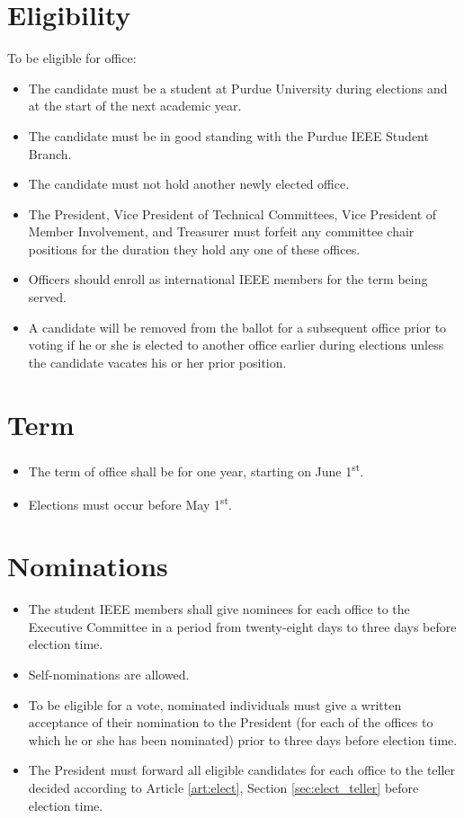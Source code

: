 \documentclass[12pt]{constitution}
\newcommand{\datetermstart}{June 1\textsuperscript{st}} %
\newcommand{\dateelectionsheld}{May 1\textsuperscript{st}} %
\begin{document}
\section{Eligibility}
\label{sec:elect_elig}
To be eligible for office:
\begin{itemize}
    \item The candidate must be a student at Purdue University during elections and at the start of the next academic year.
    \item The candidate must be in good standing with the Purdue IEEE Student Branch.
    \item The candidate must not hold another newly elected office.
    \item The President, Vice President of Technical Committees, Vice President of Member Involvement, and Treasurer must forfeit any committee chair positions for the duration they hold any one of these offices.
    \item Officers should enroll as international IEEE members for the term being served.
    \item A candidate will be removed from the ballot for a subsequent office prior to voting if he or she is elected to another office earlier during elections unless the candidate vacates his or her prior position.    
\end{itemize}

\section{Term}
\label{sec:elect_term}
\begin{itemize}
    \item The term of office shall be for one year, starting on \datetermstart{}.
    \item Elections must occur before \dateelectionsheld{}.
\end{itemize}

\section{Nominations}
\label{sec:elect_nom}
\begin{itemize}
    \item The student IEEE members shall give nominees for each office to the Executive Committee in a period from twenty-eight days to three days before election time.
    \item Self-nominations are allowed.
    \item To be eligible for a vote, nominated individuals must give a written acceptance of their nomination to the President (for each of the offices to which he or she has been nominated) prior to three days before election time.
    \item The President must forward all eligible candidates for each office to the teller decided according to Article \ref{art:elect}, Section \ref{sec:elect_teller} before election time.
\end{itemize}
\end{document}
